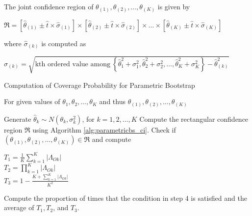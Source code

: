 \documentclass[
  12pt,
  a4paper,
]{article}
\numberwithin{equation}{section}
\begin{document}
\begin{algorithm}[H]
\begin{algorithmic}[1]
        \State The joint confidence region of $\theta_{(1)}, \theta_{(2)}, \dots, \theta_{(K)}$ is given by 
        \Statex \begin{minipage}{\linewidth}
    \centering
$\mathfrak{R} = \left[ \hat\theta_{(1)} \pm \hat t \times \hat\sigma_{(1)}  \right] \times \left[ \hat\theta_{(2)} \pm \hat t \times \hat\sigma_{(2)}  \right] \times \dots \times \left[ \hat\theta_{(K)} \pm \hat t \times \hat\sigma_{(K)}  \right]$
    \end{minipage}
         where $\hat \sigma_{(k)}$ is computed as
        \Statex \begin{minipage}{\linewidth}
    \centering
$\hat\sigma_{(k)} = \sqrt{\text{kth ordered value among} \ \left\{ \hat{\theta}^{2}_{1} + \sigma_1^2, \hat{\theta}^{2}_{2} + \sigma_2^2, \dots, \hat{\theta}^{2}_{K} + \sigma_K^2 \right\} - \hat {\theta}^{2}_{(k)}}$
\end{minipage}
    \end{algorithmic} 
\end{algorithm}

\begin{algorithm}[H]
    \caption{Computation of Coverage Probability for Parametric Bootstrap} 
    \label{alg:parametricbs_cov}
    For given values of $\theta_1, \theta_2, \dots, \theta_K$ and thus $\theta_{(1)}, \theta_{(2)}, \dots, \theta_{(K)}$
    \begin{algorithmic}[1] %
            \State Generate $\hat\theta_k \sim N(\theta_k, \sigma^2_k)$, for $k = 1, 2, \dots, K$
            \State Compute the rectangular confidence region $\mathfrak{R}$ using Algorithm \ref{alg:parametricbs_ci}.
            \State Check if $\left( \theta_{(1)}, \theta_{(2)}, \dots, \theta_{(K)}\right) \in \mathfrak{R}$ and compute 
            \Statex \begin{minipage}{\linewidth}
        \centering
            $T_1 = \frac{1}{K} \sum^K_{k=1} \Big | \Lambda_{Ok} \Big|$\\
            $T_2 = \prod^K_{k=1} \Big | \Lambda_{Ok} \Big|$\\
            $T_3 = 1 - \frac{K + \sum^K_{k=1} \big | \Lambda_{Ok} \big|}{K^2}$\\
            \end{minipage}
        \EndFor
    \State Compute the proportion of times that the condition in step 4 is satisfied and the average of $T_1, T_2$, and $T_3$.
    \end{algorithmic} %
\end{algorithm}
\end{document}
